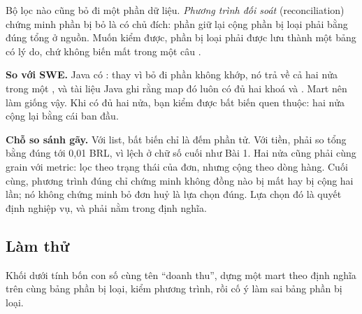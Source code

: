 Bộ lọc nào cũng bỏ đi một phần dữ liệu. \textit{Phương trình đối soát} (reconciliation) chứng minh phần bị bỏ là có chủ đích: phần giữ lại cộng phần bị loại phải bằng đúng tổng ở nguồn. Muốn kiểm được, phần bị loại phải được lưu thành một bảng có lý do, chứ không biến mất trong một câu .

\begin{ghichu}
\textbf{So với SWE.} Java có : thay vì  bỏ đi phần không khớp, nó trả về cả hai nửa trong một , và tài liệu Java ghi rằng map đó luôn có đủ hai khoá  và . Mart nên làm giống vậy. Khi có đủ hai nửa, bạn kiểm được bất biến quen thuộc: hai nửa cộng lại bằng cái ban đầu.

\textbf{Chỗ so sánh gãy.} Với list, bất biến chỉ là đếm phần tử. Với tiền, phải so tổng bằng  đúng tới 0,01 BRL, vì  lệch ở chữ số cuối như Bài 1. Hai nửa cũng phải cùng grain với metric: lọc theo trạng thái của đơn, nhưng cộng theo dòng hàng. Cuối cùng, phương trình đúng chỉ chứng minh không đồng nào bị mất hay bị cộng hai lần; nó không chứng minh bỏ đơn huỷ là lựa chọn đúng. Lựa chọn đó là quyết định nghiệp vụ, và phải nằm trong định nghĩa.
\end{ghichu}

\subsection{Làm thử}

Khối dưới tính bốn con số cùng tên ``doanh thu'', dựng một mart theo định nghĩa trên cùng bảng phần bị loại, kiểm phương trình, rồi cố ý làm sai bảng phần bị loại.

